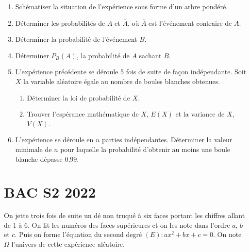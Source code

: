 \documentclass[12pt,a4paper]{article}
\begin{document}
\begin{enumerate}
    \item Schématiser la situation de l’expérience sous forme d’un arbre pondéré.
    \item Déterminer les probabilités de $A$ et $\overline{A}$, où $\overline{A}$ est l’événement contraire de $A$.
    \item Déterminer la probabilité de l’événement $B$.
    \item Déterminer $P_B(A)$, la probabilité de $A$ sachant $B$.
    \item L’expérience précédente se déroule 5 fois de suite de façon indépendante. Soit $X$ la variable aléatoire égale au nombre de boules blanches obtenues.
    \begin{enumerate}
        \item Déterminer la loi de probabilité de $X$.
        \item Trouver l’espérance mathématique de $X$, $E(X)$ et la variance de $X$, $V(X)$.
    \end{enumerate}
    \item L’expérience se déroule en $n$ parties indépendantes. Déterminer la valeur minimale de $n$ pour laquelle la probabilité d’obtenir au moins une boule blanche dépasse 0,99.
\end{enumerate}

\section*{\quad BAC S2 2022}
On jette trois fois de suite un dé non truqué à six faces portant les chiffres allant de 1 à 6. On lit les numéros des faces supérieures et on les note dans l'ordre $a$, $b$ et $c$. Puis on forme l’équation du second degré $(E) : ax^2 + bx + c = 0$. On note $\Omega$ l’univers de cette expérience aléatoire.
\end{document}
